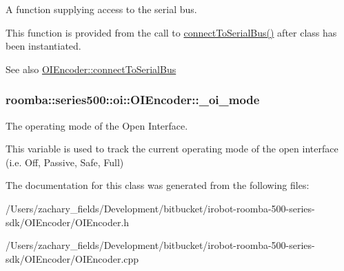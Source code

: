 A function supplying access to the serial bus. 

This function is provided from the call to \hyperlink{classroomba_1_1series500_1_1oi_1_1_o_i_encoder_ac70158274e90759a4d93ccf27a076c47}{connect\+To\+Serial\+Bus()} after class has been instantiated. \begin{DoxySeeAlso}{See also}
\hyperlink{classroomba_1_1series500_1_1oi_1_1_o_i_encoder_ac70158274e90759a4d93ccf27a076c47}{O\+I\+Encoder\+::connect\+To\+Serial\+Bus} 
\end{DoxySeeAlso}
\hypertarget{classroomba_1_1series500_1_1oi_1_1_o_i_encoder_a22983349615457194a9714375f391b8b}{
\subsubsection[{\+\_\+oi\+\_\+mode}]{ roomba\+::series500\+::oi\+::\+O\+I\+Encoder\+::\+\_\+oi\+\_\+mode\hspace{0.3cm}{\ttfamily [protected]}}}\label{classroomba_1_1series500_1_1oi_1_1_o_i_encoder_a22983349615457194a9714375f391b8b}


The operating mode of the Open Interface. 

This variable is used to track the current operating mode of the open interface (i.\+e. Off, Passive, Safe, Full) 

The documentation for this class was generated from the following files\+:\begin{DoxyCompactItemize}
\item 
/\+Users/zachary\+\_\+fields/\+Development/bitbucket/irobot-\/roomba-\/500-\/series-\/sdk/\+O\+I\+Encoder/O\+I\+Encoder.\+h\item 
/\+Users/zachary\+\_\+fields/\+Development/bitbucket/irobot-\/roomba-\/500-\/series-\/sdk/\+O\+I\+Encoder/O\+I\+Encoder.\+cpp\end{DoxyCompactItemize}
